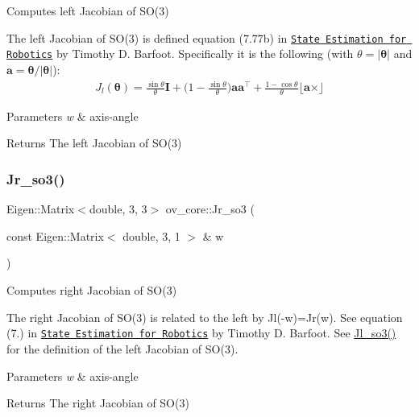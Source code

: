 Computes left Jacobian of S\+O(3) 

The left Jacobian of S\+O(3) is defined equation (7.\+77b) in \href{http://asrl.utias.utoronto.ca/~tdb/bib/barfoot_ser17.pdf}{\tt State Estimation for Robotics} by Timothy D. Barfoot. Specifically it is the following (with $\theta=|\boldsymbol\theta|$ and $\mathbf a=\boldsymbol\theta/|\boldsymbol\theta|$)\+: \begin{align*} J_l(\boldsymbol\theta) = \frac{\sin\theta}{\theta}\mathbf I + \Big(1-\frac{\sin\theta}{\theta}\Big)\mathbf a \mathbf a^\top + \frac{1-\cos\theta}{\theta}\lfloor \mathbf a \times\rfloor \end{align*}


\begin{DoxyParams}{Parameters}
{\em w} & axis-\/angle \\
\hline
\end{DoxyParams}
\begin{DoxyReturn}{Returns}
The left Jacobian of S\+O(3) 
\end{DoxyReturn}
\mbox{\label{namespaceov__core_a0406d085d6175d3bc8a539328ec214b5}} 
\subsubsection{\texorpdfstring{Jr\+\_\+so3()}{Jr\_so3()}}
{\footnotesize\ttfamily Eigen\+::\+Matrix$<$double, 3, 3$>$ ov\+\_\+core\+::\+Jr\+\_\+so3 (\begin{DoxyParamCaption}\item[{const Eigen\+::\+Matrix$<$ double, 3, 1 $>$ \&}]{w }\end{DoxyParamCaption})\hspace{0.3cm}{\ttfamily [inline]}}



Computes right Jacobian of S\+O(3) 

The right Jacobian of S\+O(3) is related to the left by Jl(-\/w)=Jr(w). See equation (7.) in \href{http://asrl.utias.utoronto.ca/~tdb/bib/barfoot_ser17.pdf}{\tt State Estimation for Robotics} by Timothy D. Barfoot. See \hyperlink{namespaceov__core_a518b7324a4106ccad60558e2e5c4b14f}{Jl\+\_\+so3()} for the definition of the left Jacobian of S\+O(3).


\begin{DoxyParams}{Parameters}
{\em w} & axis-\/angle \\
\hline
\end{DoxyParams}
\begin{DoxyReturn}{Returns}
The right Jacobian of S\+O(3) 
\end{DoxyReturn}
\mbox{\label{namespaceov__core_aaf3626f4ed6392b8b0b0d0a75ff08a61}} 
